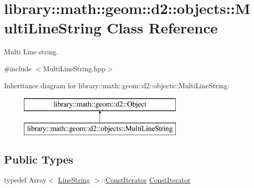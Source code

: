 \hypertarget{classlibrary_1_1math_1_1geom_1_1d2_1_1objects_1_1_multi_line_string}{}\section{library\+:\+:math\+:\+:geom\+:\+:d2\+:\+:objects\+:\+:Multi\+Line\+String Class Reference}
\label{classlibrary_1_1math_1_1geom_1_1d2_1_1objects_1_1_multi_line_string}


Multi Line string.  




{\ttfamily \#include $<$Multi\+Line\+String.\+hpp$>$}

Inheritance diagram for library\+:\+:math\+:\+:geom\+:\+:d2\+:\+:objects\+:\+:Multi\+Line\+String\+:\begin{figure}[H]
\begin{center}
\leavevmode
\includegraphics[height=2.000000cm]{classlibrary_1_1math_1_1geom_1_1d2_1_1objects_1_1_multi_line_string}
\end{center}
\end{figure}
\subsection*{Public Types}
\begin{DoxyCompactItemize}
\item 
typedef Array$<$ \hyperlink{classlibrary_1_1math_1_1geom_1_1d2_1_1objects_1_1_line_string}{Line\+String} $>$\+::\hyperlink{classlibrary_1_1math_1_1geom_1_1d2_1_1objects_1_1_multi_line_string_ae9d86dd3f4a78f03347ada9781158b85}{Const\+Iterator} \hyperlink{classlibrary_1_1math_1_1geom_1_1d2_1_1objects_1_1_multi_line_string_ae9d86dd3f4a78f03347ada9781158b85}{Const\+Iterator}
\end{DoxyCompactItemize}
